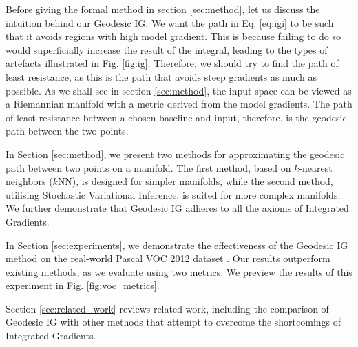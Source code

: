 Before giving the formal method in section \ref{sec:method}, let us discuss the intuition behind our Geodesic IG. We want the path in Eq. \ref{eq:igi} to be such that it avoids regions with high model gradient. This is because failing to do so would superficially increase the result of the integral, leading to the types of artefacts illustrated in Fig. \ref{fig:ig}. Therefore, we should try to find the path of least resistance, as this is the path that avoids steep gradients as much as possible. As we shall see in section \ref{sec:method}, the input space can be viewed as a Riemannian manifold with a metric derived from the model gradients. The path of least resistance between a chosen baseline and input, therefore, is the geodesic path between the two points.

In Section \ref{sec:method}, we present two methods for approximating the geodesic path between two points on a manifold. The first method, based on $k$-nearest neighbors ($k$NN), is designed for simpler manifolds, while the second method, utilising Stochastic Variational Inference, is suited for more complex manifolds. We further demonstrate that Geodesic IG adheres to all the axioms of Integrated Gradients.


In Section \ref{sec:experiments}, we demonstrate the effectiveness of the Geodesic IG method on the real-world Pascal VOC 2012 dataset \citep{pascal-voc-2012}. Our results outperform existing methods, as we evaluate using two metrics. We preview the results of this experiment in Fig. \ref{fig:voc_metrics}.

Section \ref{sec:related_work} reviews related work, including the comparison of Geodesic IG with other methods that attempt to overcome the shortcomings of Integrated Gradients.